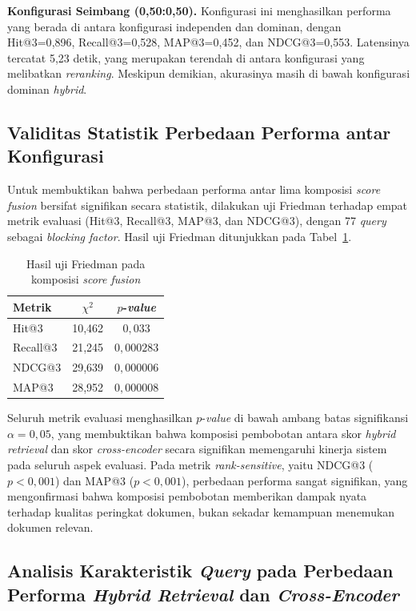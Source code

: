 \textbf{Konfigurasi Seimbang (0{,}50:0{,}50).} Konfigurasi ini menghasilkan performa yang berada di antara konfigurasi independen dan dominan, dengan Hit@3=0{,}896, Recall@3=0{,}528, MAP@3=0{,}452, dan NDCG@3=0{,}553. Latensinya tercatat 5{,}23 detik, yang merupakan terendah di antara konfigurasi yang melibatkan \textit{reranking}. Meskipun demikian, akurasinya masih di bawah konfigurasi dominan \textit{hybrid}.

\subsection{Validitas Statistik Perbedaan Performa antar Konfigurasi}

Untuk membuktikan bahwa perbedaan performa antar lima komposisi \textit{score fusion} bersifat signifikan secara statistik, dilakukan uji Friedman terhadap empat metrik evaluasi (Hit@3, Recall@3, MAP@3, dan NDCG@3), dengan 77 \textit{query} sebagai \textit{blocking factor}. Hasil uji Friedman ditunjukkan pada Tabel~\ref{tbl:432_friedman_fusion}.

\begin{table}[H]
	\centering
	\caption{Hasil uji Friedman pada komposisi \textit{score fusion}}
	\label{tbl:432_friedman_fusion}
	\small
	\begin{tabular}{lcc}
		\toprule
		Metrik & $\chi^2$ & $p$-\textit{value} \\
		\midrule
		Hit@3    & 10{,}462 & $0{,}033$       \\
		Recall@3      & 21{,}245 & $0{,}000283$    \\
		NDCG@3        & 29{,}639 & $0{,}000006$    \\
		MAP@3         & 28{,}952 & $0{,}000008$    \\
		\bottomrule
	\end{tabular}
\end{table}

Seluruh metrik evaluasi menghasilkan $p$-\textit{value} di bawah ambang batas signifikansi $\alpha = 0{,}05$, yang membuktikan bahwa komposisi pembobotan antara skor \textit{hybrid retrieval} dan skor \textit{cross-encoder} secara signifikan memengaruhi kinerja sistem pada seluruh aspek evaluasi. Pada metrik \textit{rank-sensitive}, yaitu NDCG@3 ($p < 0{,}001$) dan MAP@3 ($p < 0{,}001$), perbedaan performa sangat signifikan, yang mengonfirmasi bahwa komposisi pembobotan memberikan dampak nyata terhadap kualitas peringkat dokumen, bukan sekadar kemampuan menemukan dokumen relevan.

\subsection{Analisis Karakteristik \textit{Query} pada Perbedaan Performa \textit{Hybrid Retrieval} dan \textit{Cross-Encoder}}

